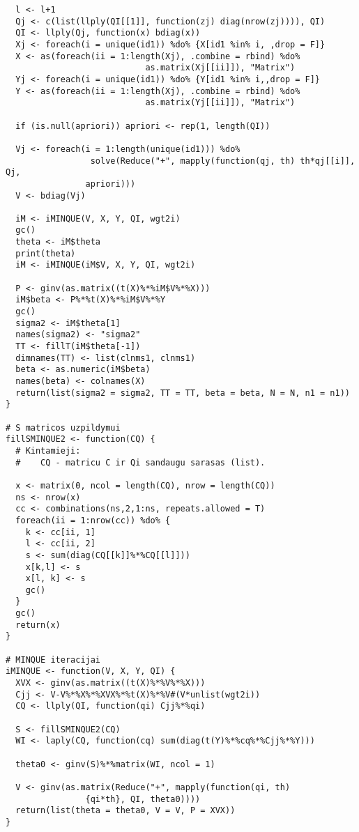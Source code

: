 \documentclass[12pt,a4paper]{article}
\begin{document}
\begin{appendix}
\begin{footnotesize}
\begin{verbatim}
  l <- l+1
  Qj <- c(list(llply(QI[[1]], function(zj) diag(nrow(zj)))), QI)
  QI <- llply(Qj, function(x) bdiag(x))
  Xj <- foreach(i = unique(id1)) %do% {X[id1 %in% i, ,drop = F]}
  X <- as(foreach(ii = 1:length(Xj), .combine = rbind) %do% 
                            as.matrix(Xj[[ii]]), "Matrix")
  Yj <- foreach(i = unique(id1)) %do% {Y[id1 %in% i,,drop = F]}
  Y <- as(foreach(ii = 1:length(Xj), .combine = rbind) %do% 
                            as.matrix(Yj[[ii]]), "Matrix")
  
  if (is.null(apriori)) apriori <- rep(1, length(QI))
  
  Vj <- foreach(i = 1:length(unique(id1))) %do% 
                 solve(Reduce("+", mapply(function(qj, th) th*qj[[i]], Qj, 
	            apriori))) 
  V <- bdiag(Vj)

  iM <- iMINQUE(V, X, Y, QI, wgt2i)
  gc()
  theta <- iM$theta
  print(theta)
  iM <- iMINQUE(iM$V, X, Y, QI, wgt2i)

  P <- ginv(as.matrix((t(X)%*%iM$V%*%X)))
  iM$beta <- P%*%t(X)%*%iM$V%*%Y
  gc()
  sigma2 <- iM$theta[1]
  names(sigma2) <- "sigma2"
  TT <- fillT(iM$theta[-1])
  dimnames(TT) <- list(clnms1, clnms1)
  beta <- as.numeric(iM$beta)
  names(beta) <- colnames(X)
  return(list(sigma2 = sigma2, TT = TT, beta = beta, N = N, n1 = n1))
}

# S matricos uzpildymui
fillSMINQUE2 <- function(CQ) {
  # Kintamieji:
  #    CQ - matricu C ir Qi sandaugu sarasas (list).

  x <- matrix(0, ncol = length(CQ), nrow = length(CQ))
  ns <- nrow(x)
  cc <- combinations(ns,2,1:ns, repeats.allowed = T)
  foreach(ii = 1:nrow(cc)) %do% {
    k <- cc[ii, 1]
    l <- cc[ii, 2]
    s <- sum(diag(CQ[[k]]%*%CQ[[l]]))
    x[k,l] <- s
    x[l, k] <- s
    gc()
  }
  gc()
  return(x)
}

# MINQUE iteracijai
iMINQUE <- function(V, X, Y, QI) {
  XVX <- ginv(as.matrix((t(X)%*%V%*%X)))
  Cjj <- V-V%*%X%*%XVX%*%t(X)%*%V#(V*unlist(wgt2i))
  CQ <- llply(QI, function(qi) Cjj%*%qi)
  
  S <- fillSMINQUE2(CQ)
  WI <- laply(CQ, function(cq) sum(diag(t(Y)%*%cq%*%Cjj%*%Y)))

  theta0 <- ginv(S)%*%matrix(WI, ncol = 1)

  V <- ginv(as.matrix(Reduce("+", mapply(function(qi, th)
                {qi*th}, QI, theta0))))
  return(list(theta = theta0, V = V, P = XVX))
}


\end{verbatim}
\end{footnotesize}
\end{appendix}
\end{document}
